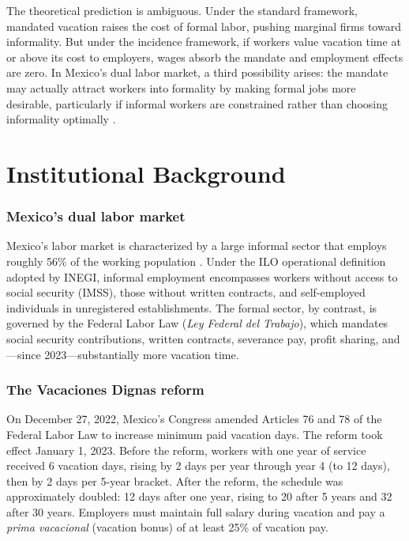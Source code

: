 \documentclass[12pt]{article}
\begin{document}
The theoretical prediction is ambiguous. Under the standard \citet{lazear1990} framework, mandated vacation raises the cost of formal labor, pushing marginal firms toward informality. But under the \citet{summers1989} incidence framework, if workers value vacation time at or above its cost to employers, wages absorb the mandate and employment effects are zero. In Mexico's dual labor market, a third possibility arises: the mandate may actually attract workers into formality by making formal jobs more desirable, particularly if informal workers are constrained rather than choosing informality optimally \citep{perry2007, maloney2004}.

\section{Institutional Background}

\subsubsection*{Mexico's dual labor market} Mexico's labor market is characterized by a large informal sector that employs roughly 56\% of the working population \citep{ilo2018}. Under the ILO operational definition adopted by INEGI, informal employment encompasses workers without access to social security (IMSS), those without written contracts, and self-employed individuals in unregistered establishments. The formal sector, by contrast, is governed by the Federal Labor Law (\textit{Ley Federal del Trabajo}), which mandates social security contributions, written contracts, severance pay, profit sharing, and---since 2023---substantially more vacation time.

\subsubsection*{The Vacaciones Dignas reform} On December 27, 2022, Mexico's Congress amended Articles 76 and 78 of the Federal Labor Law to increase minimum paid vacation days. The reform took effect January 1, 2023. Before the reform, workers with one year of service received 6 vacation days, rising by 2 days per year through year 4 (to 12 days), then by 2 days per 5-year bracket. After the reform, the schedule was approximately doubled: 12 days after one year, rising to 20 after 5 years and 32 after 30 years. Employers must maintain full salary during vacation and pay a \textit{prima vacacional} (vacation bonus) of at least 25\% of vacation pay.
\end{document}
